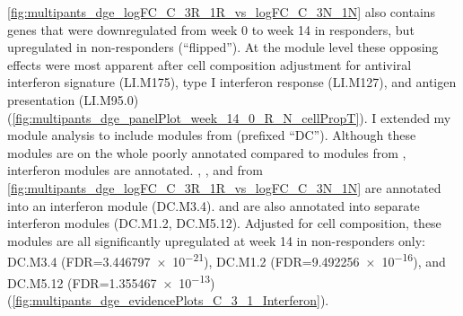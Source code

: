 \cref{fig:multipants_dge_logFC_C_3R_1R_vs_logFC_C_3N_1N} also contains genes that were downregulated from week 0 to week 14 in responders, but upregulated in non-responders (\enquote{flipped}).
At the module level these opposing effects were most apparent after cell composition adjustment for 
antiviral interferon signature (LI.M175), type I interferon response (LI.M127), and antigen presentation (LI.M95.0) (\cref{fig:multipants_dge_panelPlot_week_14_0_R_N_cellPropT}).
I extended my module analysis to include modules from \autocite{chaussabel2008ModularAnalysisFramework} (prefixed \enquote{DC}).
Although these modules are on the whole poorly annotated compared to modules from \autocite{li2013MolecularSignaturesAntibody}, interferon modules are annotated.
, , and  from \cref{fig:multipants_dge_logFC_C_3R_1R_vs_logFC_C_3N_1N} are annotated into an interferon module (DC.M3.4).
 and  are also annotated into separate interferon modules (DC.M1.2, DC.M5.12).
Adjusted for cell composition, these modules are all significantly upregulated at week 14 in non-responders only: 
DC.M3.4 (FDR=\num{3.446797e-21}),
DC.M1.2 (FDR=\num{9.492256e-16}),
and DC.M5.12 (FDR=\num{1.355467e-13})
(\cref{fig:multipants_dge_evidencePlots_C_3_1_Interferon}).

